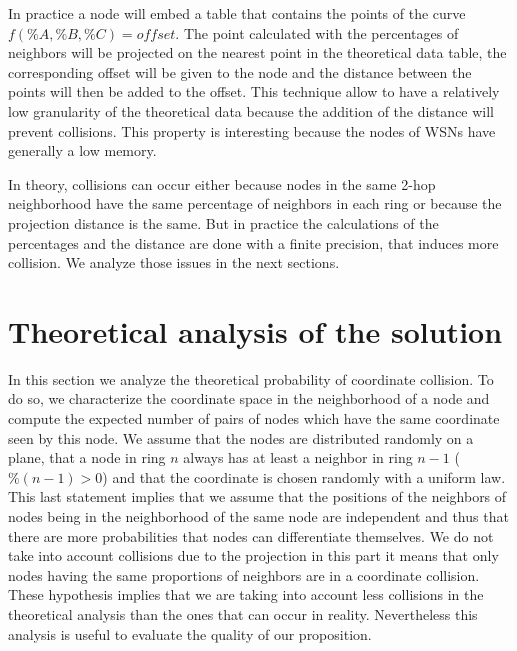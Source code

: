 \documentclass[a4paper]{article}
\begin{document}
In practice a node will embed a table that contains the points of the curve $f(\%A,\%B,\%C)=offset$. The point calculated with the percentages of neighbors will be projected on the nearest point in the theoretical data table, the corresponding offset will be given to the node and the distance between the points will then be added to the offset. This technique allow to have a relatively low granularity of the theoretical data because the addition of the distance will prevent collisions. This property is interesting because the nodes of WSNs have generally a low memory.

In theory, collisions can occur either because nodes in the same 2-hop neighborhood have the same percentage of neighbors in each ring or because the projection distance is the same. But in practice the calculations of the percentages and the distance are done with a finite precision, that induces more collision. We analyze those issues in the next sections.

\section{Theoretical analysis of the solution}
In this section we analyze the theoretical probability of coordinate collision. To do so, we characterize the coordinate space in the neighborhood of a node and compute the expected number of pairs of nodes which have the same coordinate seen by this node. We assume that the nodes are distributed randomly on a plane, that a node in ring $n$ always has at least a neighbor in ring $n-1$ ($\%(n-1)>0$) and that the coordinate is chosen randomly with a uniform law. This last statement implies that we assume that the positions of the neighbors of nodes being in the neighborhood of the same node are independent and thus that there are more probabilities that nodes can differentiate themselves. We do not take into account collisions due to the projection in this part it means that only nodes having the same proportions of neighbors are in a coordinate collision. These hypothesis implies that we are taking into account less collisions in the theoretical analysis than the ones that can occur in reality. Nevertheless this analysis is useful to evaluate the quality of our proposition.
\end{document}
